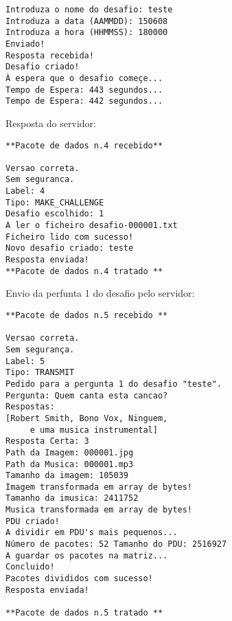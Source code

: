 \begin{multicols}{2}
{\begin{verbatim}
Introduza o nome do desafio: teste
Introduza a data (AAMMDD): 150608
Introduza a hora (HHMMSS): 180000
Enviado!
Resposta recebida!
Desafio criado!
À espera que o desafio começe...
Tempo de Espera: 443 segundos...
Tempo de Espera: 442 segundos...
\end{verbatim}

Resposta do servidor:
\begin{verbatim}
**Pacote de dados n.4 recebido**

Versao correta.
Sem seguranca.
Label: 4
Tipo: MAKE_CHALLENGE
Desafio escolhido: 1
A ler o ficheiro desafio-000001.txt
Ficheiro lido com sucesso!
Novo desafio criado: teste
Resposta enviada!
**Pacote de dados n.4 tratado **
\end{verbatim}

Envio da perfunta 1 do desafio pelo servidor:
\begin{verbatim}
**Pacote de dados n.5 recebido **

Versao correta.
Sem segurança.
Label: 5
Tipo: TRANSMIT
Pedido para a pergunta 1 do desafio "teste".
Pergunta: Quem canta esta cancao?
Respostas: 
[Robert Smith, Bono Vox, Ninguem, 
     e uma musica instrumental] 
Resposta Certa: 3
Path da Imagem: 000001.jpg
Path da Musica: 000001.mp3
Tamanho da imagem: 105039
Imagem transformada em array de bytes!
Tamanho da imusica: 2411752
Musica transformada em array de bytes!
PDU criado!
A dividir em PDU's mais pequenos...
Número de pacotes: 52 Tamanho do PDU: 2516927
A guardar os pacotes na matriz...
Concluido!
Pacotes divididos com sucesso!
Resposta enviada!

**Pacote de dados n.5 tratado **
\end{verbatim}
}
\end{multicols}
